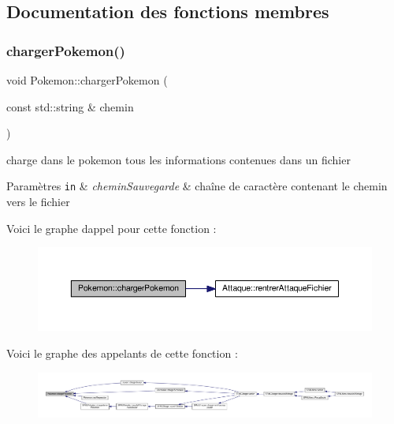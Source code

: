 \subsection{Documentation des fonctions membres}
\mbox{\label{class_pokemon_a26771eddf70badfce2fe1aeaf2d89b81}} 
\subsubsection{\texorpdfstring{charger\+Pokemon()}{chargerPokemon()}}
{\footnotesize\ttfamily void Pokemon\+::charger\+Pokemon (\begin{DoxyParamCaption}\item[{const std\+::string \&}]{chemin }\end{DoxyParamCaption})}



charge dans le pokemon tous les informations contenues dans un fichier 


\begin{DoxyParams}[1]{Paramètres}
\mbox{\tt in}  & {\em chemin\+Sauvegarde} & chaîne de caractère contenant le chemin vers le fichier \\
\hline
\end{DoxyParams}
Voici le graphe d\textquotesingle{}appel pour cette fonction \+:\nopagebreak
\begin{figure}[H]
\begin{center}
\leavevmode
\includegraphics[width=350pt]{class_pokemon_a26771eddf70badfce2fe1aeaf2d89b81_cgraph}
\end{center}
\end{figure}
Voici le graphe des appelants de cette fonction \+:\nopagebreak
\begin{figure}[H]
\begin{center}
\leavevmode
\includegraphics[width=350pt]{class_pokemon_a26771eddf70badfce2fe1aeaf2d89b81_icgraph}
\end{center}
\end{figure}
\mbox{\label{class_pokemon_ac5ce7b3dd6a431cbc5d73c27e4aeac36}} 
